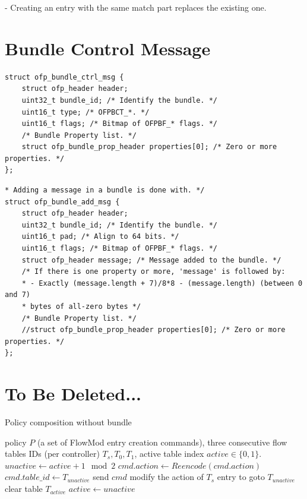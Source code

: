 \documentclass[conference]{sigcomm-alternate}
\begin{document}
\begin{appendix}
- Creating an entry with the same match part replaces the existing one.

\section{Bundle Control Message}

\begin{lstlisting}
struct ofp_bundle_ctrl_msg {
	struct ofp_header header;
	uint32_t bundle_id; /* Identify the bundle. */
	uint16_t type; /* OFPBCT_*. */
	uint16_t flags; /* Bitmap of OFPBF_* flags. */
	/* Bundle Property list. */
	struct ofp_bundle_prop_header properties[0]; /* Zero or more properties. */
};
\end{lstlisting}

\begin{lstlisting}
* Adding a message in a bundle is done with. */
struct ofp_bundle_add_msg {
	struct ofp_header header;
	uint32_t bundle_id; /* Identify the bundle. */
	uint16_t pad; /* Align to 64 bits. */
	uint16_t flags; /* Bitmap of OFPBF_* flags. */
	struct ofp_header message; /* Message added to the bundle. */
	/* If there is one property or more, 'message' is followed by:
	* - Exactly (message.length + 7)/8*8 - (message.length) (between 0 and 7)
	* bytes of all-zero bytes */
	/* Bundle Property list. */
	//struct ofp_bundle_prop_header properties[0]; /* Zero or more properties. */
};
\end{lstlisting}

\section{To Be Deleted...}

\begin{algorithm}[h]
    \caption{Policy composition without bundle}
    \label{alg:wobundle}
    \begin{algorithmic}[1]
    \Require policy $P$ (a set of FlowMod entry creation commands), three consecutive flow tables IDs (per controller) $T_s,T_0,T_1$, active table index $active\in\{0,1\}$.
    \State $unactive \gets active + 1 \mod{2}$
	    \State $cmd.action\gets Reencode(cmd.action)$
	    \State $cmd.table\_id\gets T_{unactive}$
	    \State send $cmd$
    \EndFor
    \State modify the action of $T_s$ entry to goto $T_{unactive}$
    \State clear table $T_{active}$
    \State $active \gets unactive$
	\Return


\end{algorithmic}
\end{algorithm}
\end{appendix}
\end{document}
